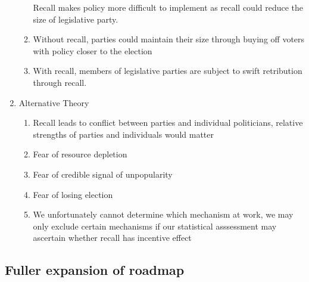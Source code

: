\documentclass[hyphens, crop=false]{standalone}
\begin{document}
\begin{enumerate}
\begin{enumerate}
			Recall makes policy more difficult to implement
			as recall could reduce the size of legislative party.
			\item 
			Without recall, parties could maintain their size through buying off voters with policy closer to the election
			\item 
			With recall, members of legislative parties are subject to swift retribution through recall.
		\end{enumerate}
		\item 
		Alternative Theory
		\begin{enumerate}
			\item 
			Recall leads to conflict between parties and individual politicians, relative strengths of parties and individuals would matter
			\item 
			Fear of resource depletion
			\item 
			Fear of credible signal of unpopularity
			\item 
			Fear of losing election
			\item 
			We unfortunately cannot determine which mechanism at work, we may only exclude certain mechanisms if our statistical asssessment may ascertain whether recall has incentive effect
		\end{enumerate}
	\end{enumerate}
	\newpage
	\subsection*{Fuller expansion of roadmap}
		
\end{document}
